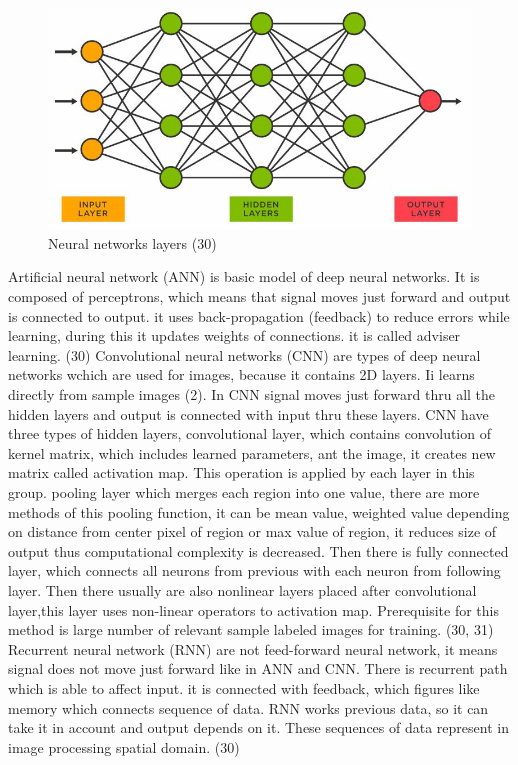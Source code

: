\documentclass[a4paper,12pt]{article}   %
\numberwithin{equation}{section}        %
\begin{document}
        \begin{figure}[h]
            \includegraphics[width=\linewidth]{neural_network.jpg}
            \caption{Neural networks layers (30)}
            \label{fig:neural_networks}
        \end{figure}

        Artificial neural network (ANN) is basic model of deep neural networks. It is composed of perceptrons, which means that signal moves just forward and output is connected to output.
        it uses back-propagation (feedback) to reduce errors while learning, during this it updates weights of connections. it is called adviser learning. (30)
        Convolutional neural networks (CNN) are types of deep neural networks wchich are used for images, because it contains 2D layers. Ii learns directly from sample images (2).
        In CNN signal moves just forward thru all the hidden layers and output is connected with input thru these layers.
        CNN have three types of hidden layers, convolutional layer, which contains convolution of kernel matrix, which includes learned parameters, ant the image, it creates new matrix
        called activation map. This operation is applied by each layer in this group. pooling layer which merges each region into one value, there are more methods of this pooling function,
        it can be mean value, weighted value depending on distance from center pixel of region or max value of region, it reduces size of output thus computational complexity is decreased.
        Then there is fully connected layer, which connects all neurons from previous with each neuron from following layer. Then there usually are also nonlinear layers placed
        after convolutional layer,this layer uses non-linear operators to activation map. Prerequisite for this method is large number of relevant sample labeled images for training. (30, 31)
        Recurrent neural network (RNN) are not feed-forward neural network, it means signal does not move just forward like in ANN and CNN. There is recurrent path which is able to affect input.
        it is connected with feedback, which figures like memory which connects sequence of data. RNN works previous data, so it can take it in account and output depends on it.
        These sequences of data represent in image processing spatial domain. (30)
\end{document}
